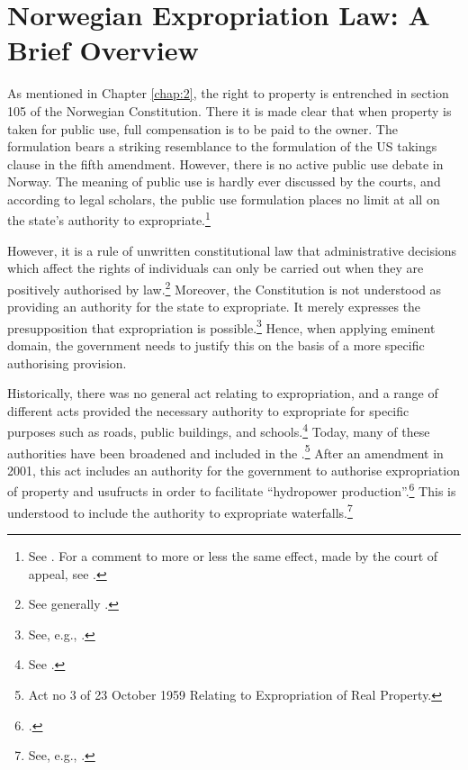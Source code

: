 \section{Norwegian Expropriation Law: A Brief Overview}\label{sec:explaw}

As mentioned in Chapter \ref{chap:2}, the right to property is entrenched in section 105 of the Norwegian Constitution. There it is made clear that when property is taken for public use, full compensation is to be paid to the owner. The formulation bears a striking resemblance to the formulation of the US takings clause in the fifth amendment. However, there is no active public use debate in Norway. The meaning of public use is hardly ever discussed by the courts, and according to legal scholars, the public use formulation places no limit at all on the state's authority to expropriate.\footnote{See \cite[249]{aall04}. For a comment to more or less the same effect, made by the court of appeal, see \cite{sauda09}.}

However, it is a rule of unwritten constitutional law that administrative decisions which affect the rights of individuals can only be carried out when they are positively authorised by law.\footnote{See generally \cite{hogberg11}.} Moreover, the Constitution is not understood as providing an authority for the state to expropriate. It merely expresses the presupposition that expropriation is possible.\footnote{See, e.g., \cite[6]{fleischer86}.} Hence, when applying eminent domain, the government needs to justify this on the basis of a more specific authorising provision. 

Historically, there was no general act relating to expropriation, and a range of different acts provided the necessary authority to expropriate for specific purposes such as roads, public buildings, and schools.\footnote{See \cite[11-12]{nut54}.} Today, many of these authorities have been broadened and included in the \cite{ea59}.\footnote{Act no 3 of 23 October 1959 Relating to Expropriation of Real Property.} After an amendment in 2001, this act includes an authority for the government to authorise expropriation of property and usufructs in order to facilitate ``hydropower production''.\footcite[2 no 51]{ea59} This is understood to include the authority to expropriate waterfalls.\footnote{See, e.g., 
\cite{sauda08}.}


